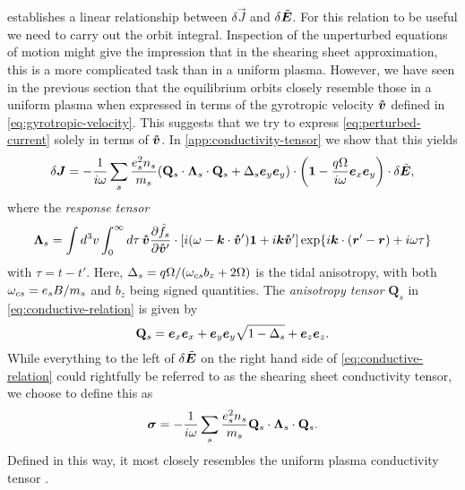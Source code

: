 \documentclass[aps,pre,notitlepage,amsmath,amssymb,amsfonts,nobibnotes,nofootinbib,superscriptaddress]{revtex4-1}
\begin{document}
 establishes a linear relationship between
$\delta\vec{J}$ and $\delta\tilde{\bm{E}}$. For this relation to be useful we need
to carry out the orbit integral. Inspection of the unperturbed equations of
motion might give the impression that in the shearing sheet approximation,
this is a more complicated task than in a uniform plasma. However, we have
seen in the previous section that the equilibrium orbits closely resemble
those in a uniform plasma when expressed in terms of the gyrotropic velocity
$\bm{\mathring{v}}$ defined in \cref{eq:gyrotropic-velocity}. This suggests that we try to
express \cref{eq:perturbed-current} solely in terms of $\bm{\mathring{v}}$. In
\cref{app:conductivity-tensor} we show that this yields
\begin{equation}
  \label{eq:conductive-relation}
  \delta\vec{J} =
  - \frac{1}{i\omega}\sums\frac{\qs^2 n_s}{m_s}
  \left(
    \mathbf{Q}_s\cdot\mathbf{\Lambda}_s\cdot\mathbf{Q}_s + \Delta_s\ey\ey
  \right)\cdot\left(\mathbf{1} - \frac{q\Omega}{i\omega}\ex\ey\right)
  \cdot\delta\tvec{E},
\end{equation}
where the \emph{response tensor}
\begin{equation}
  \label{eq:response-tensor}
  \mathbf{\Lambda}_s =
  \int d^3v\int_0^\infty d\tau\,
  \vvc\pder{\hat{f}_s}{\vvc'}\cdot
  [i(\omega - \vec{k}\cdot\vvc')\mathbf{1} + i\vec{k}\vvc']
  \exp\{i\vec{k}\cdot(\vec{r}'-\vec{r}) + i\omega\tau\}
\end{equation}
with $\tau=t-t'$. Here, $\Delta_s=q\Omega/(\omega_{cs}{}b_z+2\Omega)$ is the tidal
anisotropy, with both $\omega_{cs}=e_s{}B/m_s$ and $b_z$ being signed quantities.
The \emph{anisotropy tensor} $\mathbf{Q}_s$ in \cref{eq:conductive-relation}
is given by
\begin{equation}
  \label{eq:anisotropy-tensor}
  \mathbf{Q}_s = \ex\ex + \ey\ey\sqrt{1-\Delta_s} + \ez\ez.
\end{equation}
While everything to the left of $\delta\tilde{\bm{E}}$ on the right hand side of
\cref{eq:conductive-relation} could rightfully be referred to as the shearing
sheet conductivity tensor, we choose to define this as
\begin{equation}
  \label{eq:conductivity}
  \vec{\sigma} = -\frac{1}{i\omega}\sums\frac{\qs^2n_s}{m_s}
  \mathbf{Q}_s\cdot\mathbf{\Lambda}_s\cdot\mathbf{Q}_s.
\end{equation}
Defined in this way, it most closely resembles the uniform plasma conductivity
tensor \citep[see e.g.][]{Ichimaru1973}.
\end{document}
